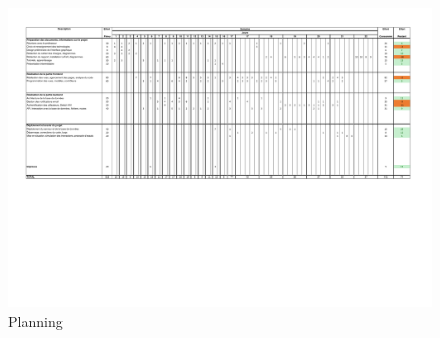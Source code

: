 \documentclass[
    iai, %
    eai, %
]{heig-tb}
\begin{document}
\begin{figure}[h]
  \centering
  \includegraphics[angle=90, height=\textheight, keepaspectratio]{Planning.pdf}
  \caption{Planning}
  \label{appendix:planning}
\end{figure}

\let\cleardoublepage\clearpage
\backmatter

\label{glossaire}
\printnoidxglossary
\printbibliography
\end{document}

